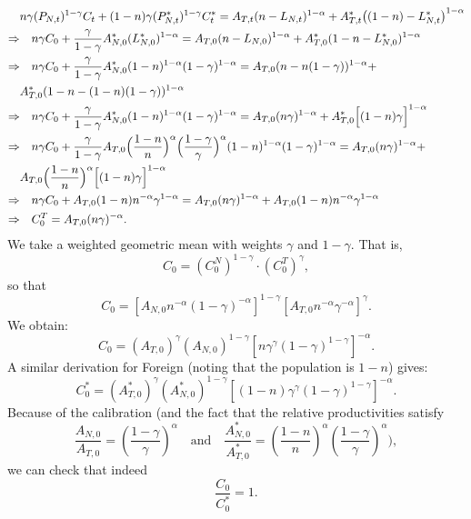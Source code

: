 \documentclass[a4paper,12pt]{article} %
\theoremstyle{nonitalic}
\begin{document}
\begin{align*}
    & n\gamma (P_{N,t})^{1-\gamma} C_t + (1-n)\gamma (P^*_{N,t})^{1-\gamma} C^*_t = A_{T,t} (n-L_{N,t})^{ 1-\alpha} + A^*_{T,t} \big((1-n)-L^*_{N,t}\big)^{ 1-\alpha} \\
    \Rightarrow & \quad n\gamma C_0 + \frac{\gamma}{1-\gamma} A_{N,0}^*(L_{N,0}^*)^{1-\alpha} = A_{T,0} (n - L_{N,0})^{1-\alpha} + A^*_{T,0} (1-n - L_{N,0}^*)^{1-\alpha} \\
    \Rightarrow & \quad n\gamma C_0 + \frac{\gamma}{1-\gamma} A_{N,0}^*(1-n)^{1-\alpha} (1-\gamma)^{1-\alpha} = A_{T,0} (n - n(1-\gamma))^{1-\alpha} + \\
    & A^*_{T,0} (1-n - (1-n)(1-\gamma))^{1-\alpha} \\
    \Rightarrow & \quad n\gamma C_0 + \frac{\gamma}{1-\gamma} A_{N,0}^*(1-n)^{1-\alpha} (1-\gamma)^{1-\alpha} = A_{T,0} (n\gamma)^{1-\alpha} + A^*_{T,0} \Bigl[(1-n)\gamma\Bigr]^{1-\alpha} \\
    \Rightarrow & \quad n\gamma C_0 + \frac{\gamma}{1-\gamma} A_{T,0} \Bigl(\frac{1-n}{n}\Bigr)^{\alpha} \Bigl(\frac{1-\gamma}{\gamma}\Bigr)^{\alpha} (1-n)^{1-\alpha} (1-\gamma)^{1-\alpha} = A_{T,0} (n\gamma)^{1-\alpha} + \\
    & A_{T,0} \Bigl(\frac{1-n}{n}\Bigr)^{\alpha} \Bigl[(1-n)\gamma\Bigr]^{1-\alpha} \\
    \Rightarrow & \quad n\gamma C_0 + A_{T,0}(1-n) n^{-\alpha} \gamma^{1-\alpha} = A_{T,0} (n\gamma)^{1-\alpha} + A_{T,0} (1-n) n^{-\alpha} \gamma^{1-\alpha} \\
    \Rightarrow & \quad C_0^T = A_{T,0} (n\gamma)^{-\alpha}.
\end{align*}
We take a weighted geometric mean with weights $\gamma$ and $1-\gamma$. That is,
\[
C_0 = (C_{0}^N)^{1-\gamma} \cdot (C_{0}^T)^{\gamma},
\]
so that
\[
C_0 = \left[A_{N,0}  n^{-\alpha}(1-\gamma)^{-\alpha}\right]^{1-\gamma}
\left[A_{T,0}  n^{-\alpha} \gamma^{-\alpha}\right]^{\gamma}.
\]
We obtain:
\[
\boxed{
C_0 = (A_{T,0})^{\gamma}(A_{N,0})^{1-\gamma}  \left[n \gamma^{\gamma}(1-\gamma)^{1-\gamma}\right]^{-\alpha}.
}
\]
A similar derivation for Foreign (noting that the population is $1-n$) gives:
\[
\boxed{
C^*_0 = (A^*_{T,0})^{\gamma}(A^*_{N,0})^{1-\gamma} \left[(1-n)\gamma^{\gamma}(1-\gamma)^{1-\gamma}\right]^{-\alpha}.
}
\]
Because of the calibration (and the fact that the relative productivities satisfy
\[
\frac{A_{N,0}}{A_{T,0}} = \left(\frac{1-\gamma}{\gamma}\right)^{\alpha} \quad \text{and} \quad \frac{A^*_{N,0}}{A^*_{T,0}} = \left(\frac{1-n}{n}\right)^{\alpha}\left(\frac{1-\gamma}{\gamma}\right)^{\alpha}),
\]
we can check that indeed
\[
\frac{C_0}{C^*_0}=1.
\]
\end{document}
